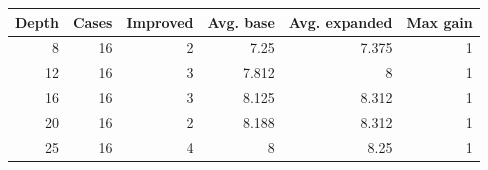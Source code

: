 {\small
\begin{tabular}{rrrrrr}
\hline
Depth & Cases & Improved & Avg. base & Avg. expanded & Max gain \\
\hline
8 & 16 & 2 & 7.25 & 7.375 & 1 \\
12 & 16 & 3 & 7.812 & 8 & 1 \\
16 & 16 & 3 & 8.125 & 8.312 & 1 \\
20 & 16 & 2 & 8.188 & 8.312 & 1 \\
25 & 16 & 4 & 8 & 8.25 & 1 \\
\hline
\end{tabular}
}
